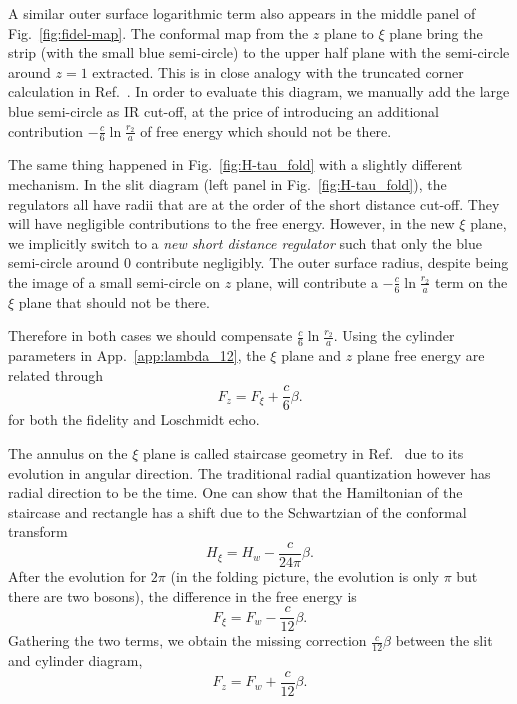 A similar outer surface logarithmic term also appears in the middle panel of Fig.~\ref{fig:fidel-map}. The conformal map from the $z$ plane to $\xi$ plane bring the strip (with the small blue semi-circle) to the upper half plane with the semi-circle around $z = 1$ extracted. This is in close analogy with the truncated corner calculation in Ref.~. In order to evaluate this diagram, we manually add the large blue semi-circle as IR cut-off, at the price of introducing an additional contribution  $-\frac{c}{6} \ln \frac{r_2}{a}$ of free energy which should not be there. 

The same thing happened in Fig.~\ref{fig:H-tau_fold} with a slightly different mechanism. In the slit diagram (left panel in Fig.~\ref{fig:H-tau_fold}), the regulators all have radii that are at the order of the short distance cut-off. They will have negligible contributions to the free energy. However, in the new $\xi$ plane, we implicitly switch to a {\it new short distance regulator} such that only the blue semi-circle around $0$ contribute negligibly. The outer surface radius, despite being the image of a small semi-circle on $z$ plane, will contribute a $-\frac{c}{6} \ln \frac{r_2}{a}$ term on the $\xi$ plane that should not be there. 

Therefore in both cases we should compensate $\frac{c}{6} \ln \frac{r_2}{a}$. Using the cylinder parameters in App.~\ref{app:lambda_12}, the $\xi$ plane and $z$ plane free energy are related through
\begin{equation}
F_{z} = F_{\xi} + \frac{c}{6} \beta .
\end{equation}
for both the fidelity and Loschmidt echo. 

The annulus on the $\xi$ plane is called staircase geometry in Ref.~ due to its evolution in angular direction. The traditional radial quantization however has radial direction to be the time. One can show that the Hamiltonian of the staircase and rectangle has a shift due to the Schwartzian\cite{cardy_finite-size_1988} of the conformal transform
\begin{equation}
H_{\xi} = H_{w} - \frac{c}{24\pi} \beta .
\end{equation}
After the evolution for $2\pi$ (in the folding picture, the evolution is only $\pi$ but there are two bosons), the difference in the free energy is
\begin{equation}
F_{\xi} = F_{w} - \frac{c}{12} \beta .
\end{equation}
Gathering the two terms, we obtain the missing correction $\frac{c}{12} \beta$ between the slit and cylinder diagram, 
\begin{equation}
F_{z} = F_w + \frac{c}{12}\beta.
\end{equation}


